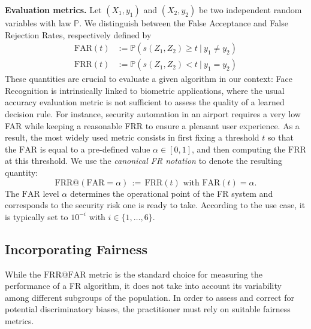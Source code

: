 \documentclass[nohyperref]{article}
\theoremstyle{plain}
\theoremstyle{definition}
\theoremstyle{remark}
\begin{document}
{\bf Evaluation metrics.} Let $(X_1, y_1)$ and $(X_2,y_2)$ be two independent random variables with law $\mathbb{P}$. We distinguish between the False Acceptance and False Rejection Rates, respectively defined by 
\begin{equation*}
\begin{array}{cc}
 \mathrm{FAR}(t) \! \! \! \! &:= \mathbb{P}( s(Z_1,Z_2) \geq t \ | \ y_1 \neq y_2) \\
 \mathrm{FRR}(t) \! \! \! \! &:= \mathbb{P}( s(Z_1,Z_2) < t \ | \ y_1 = y_2)
\end{array}    
\end{equation*}
These quantities are crucial to evaluate a given algorithm in our context: Face Recognition is intrinsically linked to biometric applications, where the usual accuracy evaluation metric is not sufficient to assess the quality of a learned decision rule. For instance, security automation in an airport requires a very low FAR while keeping a reasonable FRR to ensure a pleasant user experience. As a result, the most widely used metric consists in first fixing a threshold $t$ so that the $\mathrm{FAR}$ is equal to a pre-defined value $\alpha \in [0,1]$, and then computing the $\mathrm{FRR}$ at this threshold. We use the {\it canonical FR notation} to denote the resulting quantity:
\begin{equation*} 
\mathrm{FRR}@(\mathrm{FAR}=\alpha) \, := \, \mathrm{FRR}(t) \, \,  \text{with}  \, \, \mathrm{FAR}(t) = \alpha. 
\end{equation*}
The $\mathrm{FAR}$ level $\alpha$ determines the operational point of the FR system and corresponds to the security risk one is ready to take. According to the use case, it is typically set to $10^{-i}$ with $i \in \{1, \ldots, 6\}$.

\subsection{Incorporating Fairness}\label{subsec:fairness}
While the $\mathrm{FRR}@\mathrm{FAR}$ metric is the standard choice for measuring the performance of a FR algorithm, it does not take into account its variability among different subgroups of the population. In order to assess and correct for potential discriminatory biases, the practitioner must rely on suitable fairness metrics. 
\end{document}
